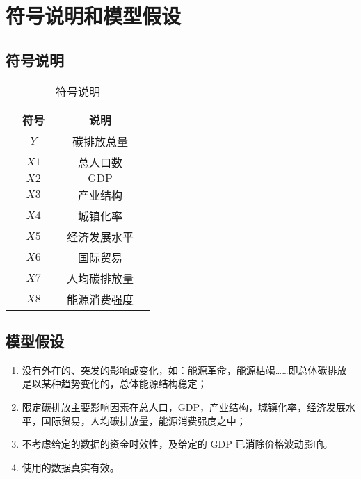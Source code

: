 \section{符号说明和模型假设}

  \subsection{符号说明}
    \begin{table}[hb]
      \caption{符号说明}
      \label{tab:fuhaoshuoming}
      \centering
      \begin{tabular*}{0.8\textwidth}{@{\extracolsep{\fill}}ccccc}
        \toprule[1.5pt]
        &符号 && 说明 &\\
        \midrule[1pt]
        &$Y$ && 碳排放总量 &\\
        &$X1$ && 总人口数 &\\
        &$X2$ && $\mathrm{GDP}$ &\\
        &$X3$ && 产业结构 &\\
        &$X4$ && 城镇化率 &\\
        &$X5$ && 经济发展水平 &\\
        &$X6$ && 国际贸易 &\\
        &$X7$ && 人均碳排放量 &\\
        &$X8$ && 能源消费强度 &\\
        \bottomrule[1.5pt]
      \end{tabular*}
    \end{table}

  \subsection{模型假设}
    \begin{enumerate}
      \item 没有外在的、突发的影响或变化，如：能源革命，能源枯竭……即总体碳排放是以某种趋势变化的，总体能源结构稳定；
      \item 限定碳排放主要影响因素在总人口，GDP，产业结构，城镇化率，经济发展水平，国际贸易，人均碳排放量，能源消费强度之中；
      \item 不考虑给定的数据的资金时效性，及给定的 $\mathrm{GDP}$ 已消除价格波动影响。
      \item 使用的数据真实有效。
    \end{enumerate}